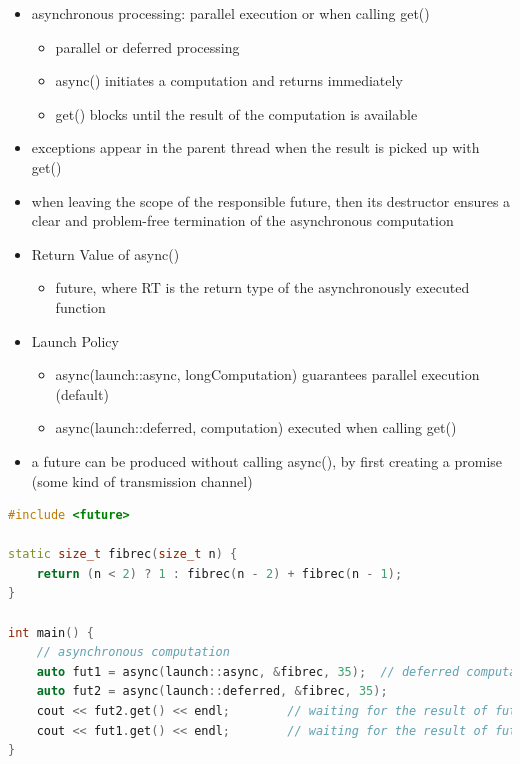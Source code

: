 \begin{itemize}
\tightlist
\item
  asynchronous processing: parallel execution or when calling get()

  \begin{itemize}
  \tightlist
  \item
    parallel or deferred processing
  \item
    async() initiates a computation and returns immediately
  \item
    get() blocks until the result of the computation is available
  \end{itemize}
\item
  exceptions appear in the parent thread when the result is picked up
  with get()
\item
  when leaving the scope of the responsible future, then its destructor
  ensures a clear and problem-free termination of the asynchronous
  computation
\item
  Return Value of async()

  \begin{itemize}
  \tightlist
  \item
    future, where RT is the return type of the asynchronously executed
    function
  \end{itemize}
\item
  Launch Policy

  \begin{itemize}
  \tightlist
  \item
    async(launch::async, longComputation) guarantees parallel execution
    (default)
  \item
    async(launch::deferred, computation) executed when calling get()
  \end{itemize}
\item
  a future can be produced without calling async(), by first creating a
  promise (some kind of transmission channel)
\end{itemize}

\begin{lstlisting}[language=C++]
#include <future>

static size_t fibrec(size_t n) {
    return (n < 2) ? 1 : fibrec(n - 2) + fibrec(n - 1);
}

int main() {
    // asynchronous computation
    auto fut1 = async(launch::async, &fibrec, 35);  // deferred computation
    auto fut2 = async(launch::deferred, &fibrec, 35);
    cout << fut2.get() << endl;        // waiting for the result of fut2
    cout << fut1.get() << endl;        // waiting for the result of fut1
}
\end{lstlisting}

